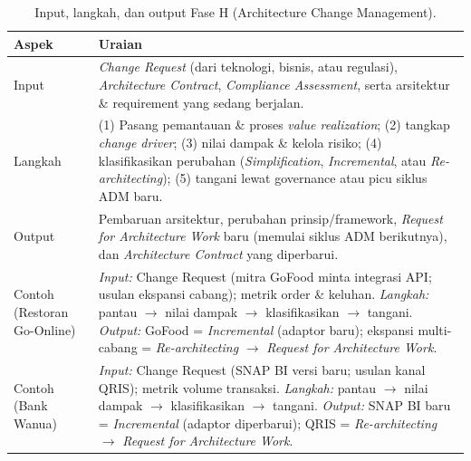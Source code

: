 \begin{table}[htbp]
\centering
\scriptsize
\caption{Input, langkah, dan output Fase H (Architecture Change Management).}
\label{tab:io-fase-h}
\begin{tabularx}{\textwidth}{@{}p{} X@{}}
\hline
\textbf{Aspek} & \textbf{Uraian} \\
\hline
Input & \emph{Change Request} (dari teknologi, bisnis, atau regulasi),
\emph{Architecture Contract}, \emph{Compliance Assessment}, serta arsitektur \&
requirement yang sedang berjalan. \\
Langkah & (1) Pasang pemantauan \& proses \emph{value realization}; (2) tangkap
\emph{change driver}; (3) nilai dampak \& kelola risiko; (4) klasifikasikan
perubahan (\emph{Simplification}, \emph{Incremental}, atau \emph{Re-architecting});
(5) tangani lewat governance atau picu siklus ADM baru. \\
Output & Pembaruan arsitektur, perubahan prinsip/framework, \emph{Request for
Architecture Work} baru (memulai siklus ADM berikutnya), dan \emph{Architecture
Contract} yang diperbarui. \\
Contoh (Restoran Go-Online) & \emph{Input:} Change Request (mitra GoFood minta
integrasi API; usulan ekspansi cabang); metrik order \& keluhan. \emph{Langkah:}
pantau $\rightarrow$ nilai dampak $\rightarrow$ klasifikasikan $\rightarrow$ tangani.
\emph{Output:} GoFood = \emph{Incremental} (adaptor baru); ekspansi multi-cabang =
\emph{Re-architecting} $\rightarrow$ \emph{Request for Architecture Work}. \\
Contoh (Bank Wanua) & \emph{Input:} Change Request (SNAP BI versi baru; usulan kanal
QRIS); metrik volume transaksi. \emph{Langkah:} pantau $\rightarrow$ nilai dampak
$\rightarrow$ klasifikasikan $\rightarrow$ tangani. \emph{Output:} SNAP BI baru =
\emph{Incremental} (adaptor diperbarui); QRIS = \emph{Re-architecting} $\rightarrow$
\emph{Request for Architecture Work}. \\
\hline
\end{tabularx}
\end{table}

